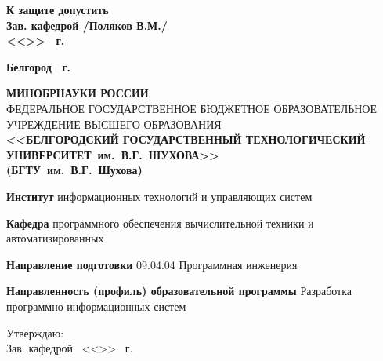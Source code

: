 \documentclass[14pt]{extarticle}
\begin{document}
\vspace{1em}
{\small
\hspace*{10em}\textbf{К защите допустить} \\[-0.5em]
\hspace*{10em}\textbf{Зав. кафедрой \underline{\hspace{4cm}} /Поляков В.М./} \\[0.3em]
\hspace*{12em}\textbf{<<\underline{\hspace{1cm}}>>\underline{\hspace{3cm}} \the\year \ г.}
}

\vspace{1em}
{\centering\small\textbf{Белгород \the\year \ г.}\par}
\newpage

\begin{center}
	\small
	\textbf{МИНОБРНАУКИ РОССИИ} \\[0.5em]
	ФЕДЕРАЛЬНОЕ ГОСУДАРСТВЕННОЕ БЮДЖЕТНОЕ ОБРАЗОВАТЕЛЬНОЕ УЧРЕЖДЕНИЕ 
	ВЫСШЕГО ОБРАЗОВАНИЯ \\[0.3em]
	\textbf{<<БЕЛГОРОДСКИЙ ГОСУДАРСТВЕННЫЙ ТЕХНОЛОГИЧЕСКИЙ\\УНИВЕРСИТЕТ~им.~В.Г.~ШУХОВА>>}\\
	\textbf{(БГТУ~им.~В.Г.~Шухова)}
\end{center}%
\begin{list}{}{\setlength{\leftmargin}{0cm}\setlength{\parsep}{1pt}}
	\small\sloppy
	\item\textbf{Институт} информационных технологий и управляющих систем
	\item\textbf{Кафедра} программного обеспечения вычислительной техники и автоматизированных 
	\item\textbf{Направление подготовки} 09.04.04 Программная инженерия
	\item\textbf{Направленность (профиль) образовательной программы} Разработка программно-информационных систем
\end{list}
\vspace{-0.5cm}
{\small\noindent
\hspace*{8.0cm}Утверждаю:\\
\hspace*{8cm}Зав. кафедрой \hrulefill \,
\hspace*{8.0cm}<<\underline{\hspace{1cm}}>> \underline{\hspace{3cm}} \the\year \ г.
}
\end{document}
